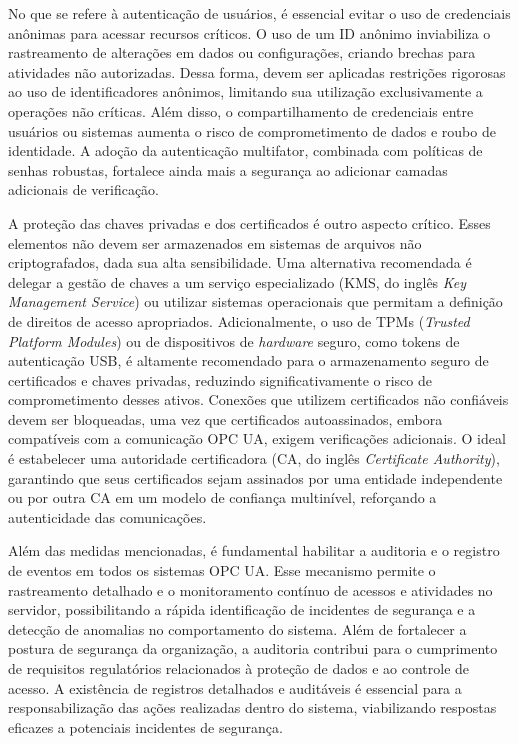         No que se refere à autenticação de usuários, é essencial evitar o uso de credenciais anônimas para acessar recursos críticos. O uso de um ID anônimo inviabiliza o rastreamento de alterações em dados ou configurações, criando brechas para atividades não autorizadas. Dessa forma, devem ser aplicadas restrições rigorosas ao uso de identificadores anônimos, limitando sua utilização exclusivamente a operações não críticas. Além disso, o compartilhamento de credenciais entre usuários ou sistemas aumenta o risco de comprometimento de dados e roubo de identidade. A adoção da autenticação multifator, combinada com políticas de senhas robustas, fortalece ainda mais a segurança ao adicionar camadas adicionais de verificação.

        A proteção das chaves privadas e dos certificados é outro aspecto crítico. Esses elementos não devem ser armazenados em sistemas de arquivos não criptografados, dada sua alta sensibilidade. Uma alternativa recomendada é delegar a gestão de chaves a um serviço especializado (KMS, do inglês \textit{Key Management Service}) ou utilizar sistemas operacionais que permitam a definição de direitos de acesso apropriados. Adicionalmente, o uso de TPMs (\textit{Trusted Platform Modules}) ou de dispositivos de \textit{hardware} seguro, como tokens de autenticação USB, é altamente recomendado para o armazenamento seguro de certificados e chaves privadas, reduzindo significativamente o risco de comprometimento desses ativos. Conexões que utilizem certificados não confiáveis devem ser bloqueadas, uma vez que certificados autoassinados, embora compatíveis com a comunicação OPC UA, exigem verificações adicionais. O ideal é estabelecer uma autoridade certificadora (CA, do inglês \textit{Certificate Authority}), garantindo que seus certificados sejam assinados por uma entidade independente ou por outra CA em um modelo de confiança multinível, reforçando a autenticidade das comunicações.

        Além das medidas mencionadas, é fundamental habilitar a auditoria e o registro de eventos em todos os sistemas OPC UA. Esse mecanismo permite o rastreamento detalhado e o monitoramento contínuo de acessos e atividades no servidor, possibilitando a rápida identificação de incidentes de segurança e a detecção de anomalias no comportamento do sistema. Além de fortalecer a postura de segurança da organização, a auditoria contribui para o cumprimento de requisitos regulatórios relacionados à proteção de dados e ao controle de acesso. A existência de registros detalhados e auditáveis é essencial para a responsabilização das ações realizadas dentro do sistema, viabilizando respostas eficazes a potenciais incidentes de segurança.

